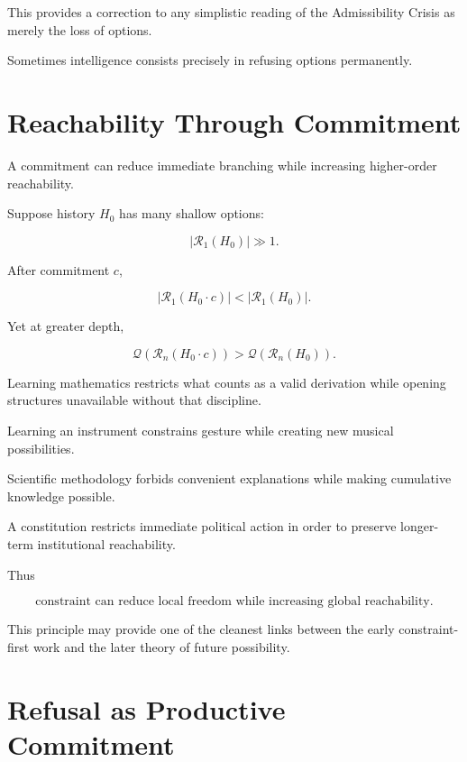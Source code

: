 \documentclass[11pt]{article}
\theoremstyle{remark}
\newcommand{\Reach}{\mathcal{R}}
\begin{document}
This provides a correction to any simplistic reading of the Admissibility Crisis as merely the loss of options.

Sometimes intelligence consists precisely in refusing options permanently.

\section{Reachability Through Commitment}

A commitment can reduce immediate branching while increasing higher-order reachability.

Suppose history $H_0$ has many shallow options:

\begin{equation}
|\Reach_1(H_0)|\gg 1.
\end{equation}

After commitment $c$,

\begin{equation}
|\Reach_1(H_0\cdot c)|
<
|\Reach_1(H_0)|.
\end{equation}

Yet at greater depth,

\begin{equation}
\mathcal{Q}
(
\Reach_n(H_0\cdot c)
)
>
\mathcal{Q}
(
\Reach_n(H_0)
).
\end{equation}

Learning mathematics restricts what counts as a valid derivation while opening structures unavailable without that discipline.

Learning an instrument constrains gesture while creating new musical possibilities.

Scientific methodology forbids convenient explanations while making cumulative knowledge possible.

A constitution restricts immediate political action in order to preserve longer-term institutional reachability.

Thus

\begin{equation}
\boxed{
\text{constraint can reduce local freedom while increasing global reachability}.
}
\end{equation}

This principle may provide one of the cleanest links between the early constraint-first work and the later theory of future possibility.

\section{Refusal as Productive Commitment}
\end{document}
